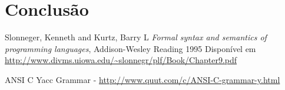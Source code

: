 \documentclass[12pt]{article}
\begin{document}
\section{Conclusão}

\begin{thebibliography}{9}
  Slonneger, Kenneth and Kurtz, Barry L
  \textit{Formal syntax and semantics of programming languages},
  Addison-Wesley Reading
  1995
  Disponível em \url{http://www.divms.uiowa.edu/~slonnegr/plf/Book/Chapter9.pdf}

\item ANSI C Yacc Grammar - \url{http://www.quut.com/c/ANSI-C-grammar-y.html}
\end{thebibliography}
	
\end{document}
